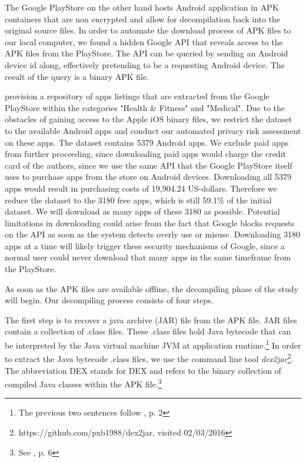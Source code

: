 \documentclass[
	a4paper,
	oneside,
	12pt,
	liststotocnumbered
]{article}
\let\cite\textcite
\begin{document}
The Google PlayStore on the other hand hosts Android application in \acs{APK} containers that are non encrypted and allow for decompilation back into the original source files. 
In order to automate the download process of \acs{APK} files to our local computer, we found a hidden Google \acs{API} that reveals access to the \acs{APK} files from the PlayStore. 
The \acs{API} can be queried by sending an Android device id along, effectively pretending to be a requesting Android device.
The result of the query is a binary \acs{APK} file.

\cite{Xu2015} provision a repository of apps listings that are extracted from the Google PlayStore within the categories "Health \& Fitness" and "Medical".
Due to the obstacles of gaining access to the Apple iOS binary files, we restrict the dataset to the available Android apps and conduct our automated privacy risk assessment on these apps.
The \cite{Xu2015} dataset contains 5379 Android apps. 
We exclude paid apps from further proceeding, since downloading paid apps would charge the credit card of the authors, since we use the same \acs{API} that the Google PlayStore itself uses to purchase apps from the store on Android devices. 
Downloading all 5379 apps would result in purchasing costs of 19,904.24 US-dollars. 
Therefore we reduce the dataset to the 3180 free apps, which is still 59.1\% of the  initial dataset. 
We will download as many apps of these 3180 as possible.
Potential limitations in downloading could arise from the fact that Google blocks requests on the API as soon as the system detects overly use or misuse. Downloading 3180 apps at a time will likely trigger these security mechanisms of Google, since a normal user could never download that many apps in the same timeframe from the PlayStore.

As soon as the \acs{APK} files are available offline, the decompiling phase of the study will begin.
Our decompiling process consists of four steps.

The first step is to recover a java archive (\acs{JAR}) file from the \acs{APK} file.
\acs{JAR} files contain a collection of .class files. 
These .class files hold Java bytecode that can be interpreted by the Java virtual machine \acs{JVM} at application runtime.\footnote{The previous two sentences follow \cite{Enck2011}, p. 2} 
In order to extract the Java bytecode .class files, we use the command line tool \textit{dex2jar}\footnote{https://github.com/pxb1988/dex2jar, visited 02/03/2016}. 
The abbreviation \acs{DEX} stands for \acl{DEX} and refers to the binary collection of compiled Java classes within the \acs{APK} file.\footnote{See \cite{xu2013techniques}, p. 6}
\end{document}
